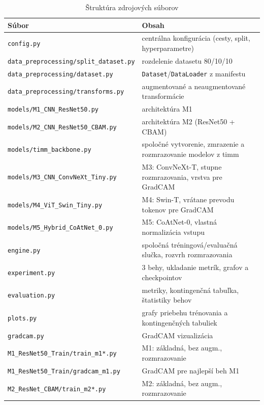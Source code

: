 \begin{table}[H]
    \centering
    \caption{Štruktúra zdrojových súborov}
    \label{tab:struktura}
    \footnotesize
    \begin{tabular}{ll}
        \toprule
        Súbor & Obsah \\
        \midrule
        \texttt{config.py} & centrálna konfigurácia (cesty, split, hyperparametre) \\
        \texttt{data\_preprocessing/split\_dataset.py} & rozdelenie datasetu 80/10/10 \\
        \texttt{data\_preprocessing/dataset.py} & \texttt{Dataset}/\texttt{DataLoader} z manifestu \\
        \texttt{data\_preprocessing/transforms.py} & augmentované a neaugmentované transformácie \\
        \texttt{models/M1\_CNN\_ResNet50.py} & architektúra M1 \\
        \texttt{models/M2\_CNN\_ResNet50\_CBAM.py} & architektúra M2 (ResNet50 + CBAM) \\
        \texttt{models/timm\_backbone.py} & spoločné vytvorenie, zmrazenie a rozmrazovanie modelov z timm \\
        \texttt{models/M3\_CNN\_ConvNeXt\_Tiny.py} & M3: ConvNeXt-T, stupne rozmrazovania, vrstva pre GradCAM \\
        \texttt{models/M4\_ViT\_Swin\_Tiny.py} & M4: Swin-T, vrátane prevodu tokenov pre GradCAM \\
        \texttt{models/M5\_Hybrid\_CoAtNet\_0.py} & M5: CoAtNet-0, vlastná normalizácia vstupu \\
        \texttt{engine.py} & spoločná tréningová/evaluačná slučka, rozvrh rozmrazovania \\
        \texttt{experiment.py} & 3 behy, ukladanie metrík, grafov a checkpointov \\
        \texttt{evaluation.py} & metriky, kontingenčná tabuľka, štatistiky behov \\
        \texttt{plots.py} & grafy priebehu trénovania a kontingenčných tabuliek \\
        \texttt{gradcam.py} & GradCAM vizualizácia \\
        \texttt{M1\_ResNet50\_Train/train\_m1*.py} & M1: základná, bez augm., rozmrazovanie \\
        \texttt{M1\_ResNet50\_Train/gradcam\_m1.py} & GradCAM pre najlepší beh M1 \\
        \texttt{M2\_ResNet\_CBAM/train\_m2*.py} & M2: základná, bez augm., rozmrazovanie \\

\end{tabular}
\end{table}
